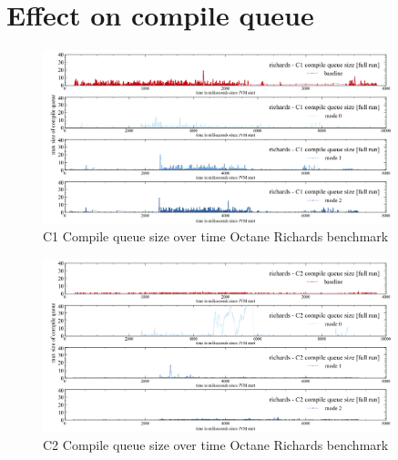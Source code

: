 \clearpage
\section{Effect on compile queue}
\label{s:perf_compilequeue}

\begin{figure}[ht]
  \begin{center}
    \centering
    \includegraphics[width=0.9\textwidth]{figures/octane_queue_richards_separate_c1.png}
    \caption{C1 Compile queue size over time Octane Richards benchmark}
    \label{f:octane_queue_richards_separate_c1}
  \end{center}
\end{figure}
\begin{figure}[ht]
  \begin{center}
    \centering
    \includegraphics[width=0.9\textwidth]{figures/octane_queue_richards_separate_c2.png}
    \caption{C2 Compile queue size over time Octane Richards benchmark}
    \label{f:octane_queue_richards_separate_c2}
  \end{center}
\end{figure}
